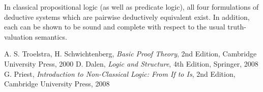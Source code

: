 \documentclass[12pt]{article}
\begin{document}
In classical propositional logic (as well as predicate logic), all four formulations of deductive systems which are pairwise deductively equivalent exist.  In addition, each can be shown to be sound and complete with respect to the usual truth-valuation semantics.

\begin{thebibliography}{0}
A. S. Troelstra, H. Schwichtenberg, 
{\it Basic Proof Theory}, 2nd Edition, Cambridge University Press, 2000
D. Dalen,
{\it Logic and Structure}, 4th Edition, Springer, 2008
G. Priest,
{\it Introduction to Non-Classical Logic: From If to Is}, 2nd Edition, Cambridge University Press, 2008
\end{thebibliography}

\end{document}

